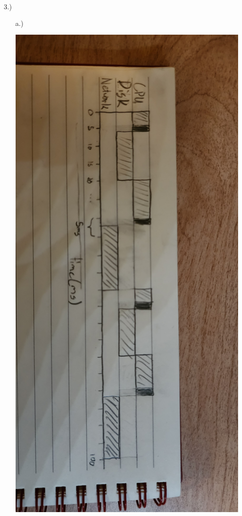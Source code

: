 \documentclass[12pt]{article}
\begin{document}
\begin{itemize}
        \item [3.)] \begin{itemize}
            \item [a.)] \ 
            \begin{center}
                \includegraphics[width=5in]{3-1.jpg}
            \end{center}


\end{itemize}
\end{itemize}
\end{document}
